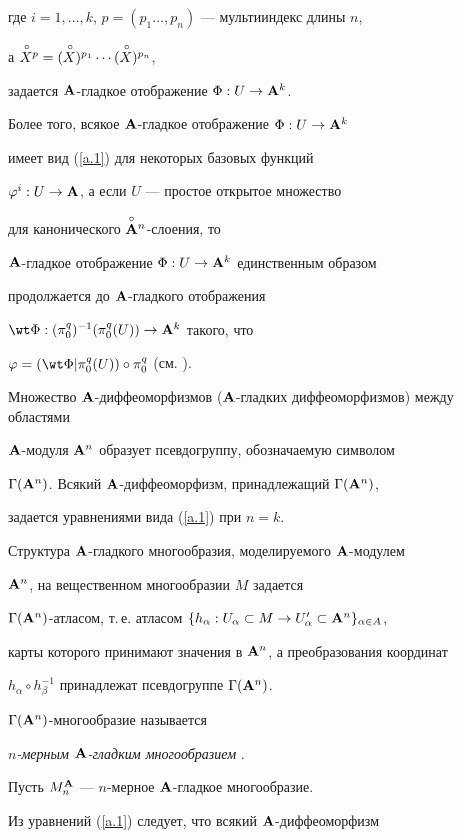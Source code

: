 где $i=1,\dotsc,k$, $p=(p_1\dotsc,p_n)$ --- мультииндекс длины  $n$,


а $\overset{\,\circ}{X}{}^p=({\overset{\,\circ}{X}{}})^{p_1}\dotsb({\overset{\,\circ}{X}{}})^{p_n}$,


задается ${\bold A}$-гладкое отображение  $\Phi:U\to{\bold A}^k$.


Более того, всякое ${\bold A}$-гладкое отображение $\Phi:U\to{\bold A}^k$


имеет вид  (\ref{a.1}) для некоторых базовых функций


$\varphi^{i}:U\to{\bold A}$, а если  $U$ --- простое открытое множество


\cite{Mol} для канонического  $\overset{\circ}{\bold A}{}^n$-слоения, то


${\bold A}$-гладкое отображение $\Phi:U\to{\bold A}^k$ единственным образом


продолжается до  ${\bold A}$-гладкого отображения 


$\wt\Phi:(\piqo)^{-1}(\piqo(U))\to\A^k$ такого, что


$\varphi=(\wt\Phi|\piqo(U))\circ\piqo$ (см. \cite{VSh3}).





Множество ${\bold A}$-диффеоморфизмов (${\bold A}$-гладких диффеоморфизмов) между областями


${\bold A}$-мо\-ду\-ля ${\bold A}^n$ образует псевдогруппу, обозначаемую символом


$\Gamma({\bold A}^n)$. Всякий ${\bold A}$-диффеоморфизм, принадлежащий $\Gamma({\bold A}^n)$,


задается уравнениями вида (\ref{a.1}) при $n=k$.


Структура ${\bold A}$-гладкого многообразия, моделируемого ${\bold A}$-модулем


${\bold A}^n$, на вещественном  многообразии $M$ задается


$\Gamma(\A^n)$-атласом, т.\,е. атласом $\{h_\alpha:U_\alpha\subset M\to


U'_\alpha\subset\A^n\}_{\alpha \in A}$,


карты которого принимают значения в ${\bold A}^n$, а преобразования координат


$h_\alpha\circ h_\beta^{-1}$ принадлежат псевдогруппе $\Gamma({\bold A}^n)$.


$\Gamma({\bold A}^n)$-многообразие называется


{\it $n$-мерным ${\bold A}$-гладким многообразием} \cite{VSh3}.


Пусть $M^{\bold A}_n$ --- $n$-мерное ${\bold A}$-гладкое многообразие.


Из уравнений (\ref{a.1}) следует, что всякий  ${\bold A}$-диффеоморфизм


